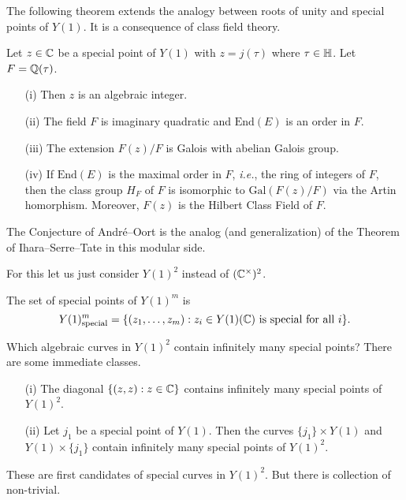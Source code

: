 The following theorem extends the analogy between roots of unity and
special points of $Y(1)$. It is a consequence of class field theory. 
\begin{theorem}
  \label{thm:galoisspecial}
  Let $z\in {\mathbb{C}}$ be a special point of $Y(1)$ with $z=j(\tau)$ where
  $\tau\in {\mathbb{H}}$. Let $F={\mathbb{Q}}(\tau)$.
  \begin{enumerate}
  \item [(i)] Then $z$ is an algebraic integer.
  \item[(ii)] The field $F$ is
    imaginary quadratic and   $\mathrm{End}(E)$ is an order
    in $F$.
  \item[(iii)] The extension $F(z)/F$ is Galois with abelian Galois
    group.
  \item[(iv)] If $\mathrm{End}(E)$ is the maximal order in $F$,
    \textit{i.e.}, the ring of integers of $F$, then
    the class group $H_F$ of $F$ is isomorphic to
    $\mathrm{Gal}(F(z)/F)$ via the Artin homorphism.
    Moreover, $F(z)$ is the Hilbert Class Field of $F$. 
  \end{enumerate}
\end{theorem}

The Conjecture of Andr\'e--Oort is the analog (and generalization) of
the Theorem of Ihara--Serre--Tate in this modular side.

For this let us just consider $Y(1)^2$ instead of $({\mathbb{C}}^\times)^2$.
\begin{definition}
  \label{def:specialY1m}
  The set of special points of  $Y(1)^m$ is
  $$Y(1)^m_{\mathrm{special}}=\{(z_1,\ldots,z_m) :
  z_i\in Y(1)({\mathbb{C}})\text{ is special for all $i$} \}.$$
\end{definition}

Which algebraic curves in $Y(1)^2$ contain infinitely many special
points? There are some immediate classes.

\begin{example}
  \begin{enumerate}
  \item[(i)] The diagonal  $\{(z,z) : z\in{\mathbb{C}}\}$ contains infinitely
    many special points of $Y(1)^2$. 
  \item [(ii)]  Let $j_1$ be a special point of $Y(1)$.  Then the curves
    $\{j_1\}\times Y(1)$ and $Y(1)\times \{j_1\}$ contain infinitely many
    special points of $Y(1)^2$. 
  \end{enumerate}
\end{example}

These are first candidates of special curves in $Y(1)^2$. 
But there is collection of non-trivial.

